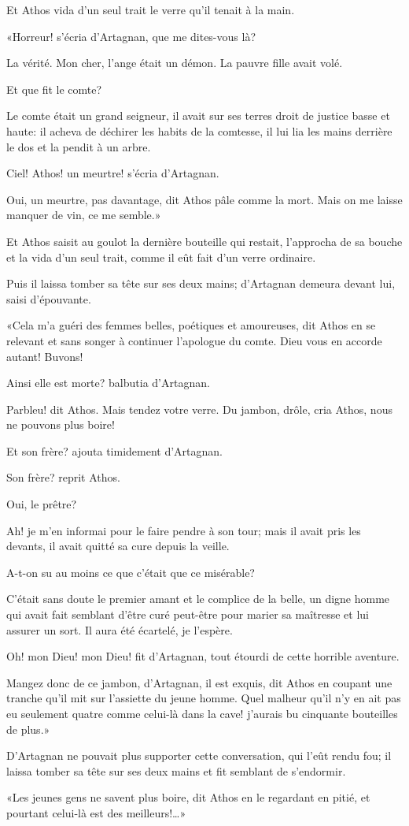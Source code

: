 Et Athos vida d'un seul trait le verre qu'il tenait à la main. 

«Horreur! s'écria d'Artagnan, que me dites-vous là? 

\speak  La vérité. Mon cher, l'ange était un démon. La pauvre fille avait volé. 

\speak  Et que fit le comte? 

\speak  Le comte était un grand seigneur, il avait sur ses terres droit de justice basse et haute: il acheva de déchirer les habits de la comtesse, il lui lia les mains derrière le dos et la pendit à un arbre. 

\speak  Ciel! Athos! un meurtre! s'écria d'Artagnan. 

\speak  Oui, un meurtre, pas davantage, dit Athos pâle comme la mort. Mais on me laisse manquer de vin, ce me semble.» 

Et Athos saisit au goulot la dernière bouteille qui restait, l'approcha de sa bouche et la vida d'un seul trait, comme il eût fait d'un verre ordinaire. 

Puis il laissa tomber sa tête sur ses deux mains; d'Artagnan demeura devant lui, saisi d'épouvante. 

«Cela m'a guéri des femmes belles, poétiques et amoureuses, dit Athos en se relevant et sans songer à continuer l'apologue du comte. Dieu vous en accorde autant! Buvons! 

\speak  Ainsi elle est morte? balbutia d'Artagnan. 

\speak  Parbleu! dit Athos. Mais tendez votre verre. Du jambon, drôle, cria Athos, nous ne pouvons plus boire! 

\speak  Et son frère? ajouta timidement d'Artagnan. 

\speak  Son frère? reprit Athos. 

\speak  Oui, le prêtre? 

\speak  Ah! je m'en informai pour le faire pendre à son tour; mais il avait pris les devants, il avait quitté sa cure depuis la veille. 

\speak  A-t-on su au moins ce que c'était que ce misérable? 

\speak  C'était sans doute le premier amant et le complice de la belle, un digne homme qui avait fait semblant d'être curé peut-être pour marier sa maîtresse et lui assurer un sort. Il aura été écartelé, je l'espère. 

\speak  Oh! mon Dieu! mon Dieu! fit d'Artagnan, tout étourdi de cette horrible aventure. 

\speak  Mangez donc de ce jambon, d'Artagnan, il est exquis, dit Athos en coupant une tranche qu'il mit sur l'assiette du jeune homme. Quel malheur qu'il n'y en ait pas eu seulement quatre comme celui-là dans la cave! j'aurais bu cinquante bouteilles de plus.» 

D'Artagnan ne pouvait plus supporter cette conversation, qui l'eût rendu fou; il laissa tomber sa tête sur ses deux mains et fit semblant de s'endormir. 

«Les jeunes gens ne savent plus boire, dit Athos en le regardant en pitié, et pourtant celui-là est des meilleurs!\dots»